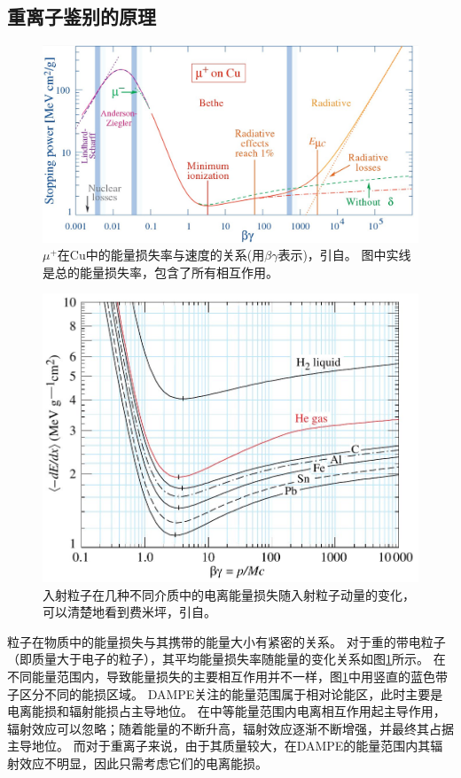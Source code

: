 \subsection{重离子鉴别的原理}
\begin{figure}[h!]
	\centering
	\includegraphics[width=0.8\linewidth]{chap/description/fig/energyloss_vs_velocity}
	\caption{${\mu}^+$在Cu中的能量损失率与速度的关系(用$\beta\gamma$表示)，引自\parencite{pdg_book}。 图中实线是总的能量损失率，包含了所有相互作用。}
	\label{fig:description:energyloss_vs_velocity}
\end{figure}

\begin{figure}[h!]
	\centering
	\includegraphics[width=0.8\linewidth]{chap/description/fig/fermi_plateau}
	\caption{入射粒子在几种不同介质中的电离能量损失随入射粒子动量的变化，可以清楚地看到费米坪，引自\parencite{pdg_book}。}
	\label{fig:description:fermi_plateau}
\end{figure}

粒子在物质中的能量损失与其携带的能量大小有紧密的关系。
对于重的带电粒子（即质量大于电子的粒子），其平均能量损失率随能量的变化关系如图\ref{fig:description:energyloss_vs_velocity}所示。
在不同能量范围内，导致能量损失的主要相互作用并不一样，图\ref{fig:description:energyloss_vs_velocity}中用竖直的蓝色带子区分不同的能损区域。
DAMPE关注的能量范围属于相对论能区，此时主要是电离能损和辐射能损占主导地位。
在中等能量范围内电离相互作用起主导作用，辐射效应可以忽略；随着能量的不断升高，辐射效应逐渐不断增强，并最终其占据主导地位。
而对于重离子来说，由于其质量较大，在DAMPE的能量范围内其辐射效应不明显，因此只需考虑它们的电离能损。

